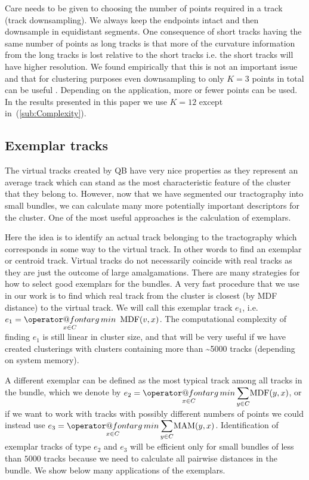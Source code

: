 \documentclass[preprint,authoryear,a4paper,10pt,onecolumn]{elsarticle}
\makeatletter
\def\argmin{\mathop{\operator@font arg\,min}}
\makeatother
\begin{document}
Care needs to be given to choosing the number of points required in a
track (track downsampling). We always keep the endpoints intact and then
downsample in equidistant segments. One consequence of short tracks
having the same number of points as long tracks is that more of the
curvature information from the long tracks is lost relative to the short
tracks i.e. the short tracks will have higher resolution.  We found
empirically that this is not an important issue and that for clustering
purposes even downsampling to only $K=3$ points in total can be useful
\citep{EGMB10}. Depending on the application, more or fewer points can
be used. In the results presented in this paper we use $K=12$ except
in~(\ref{sub:Complexity}).


\subsection{Exemplar tracks\label{sub:exemplars}}

The virtual tracks created by QB have very nice properties as they
represent an average track which can stand as the most characteristic
feature of the cluster that they belong to. However, now that we have
segmented our tractography into small bundles, we can calculate many more
potentially important descriptors for the cluster. One of the most
useful approaches is the calculation of exemplars.

Here the idea is to identify an actual track belonging to the
tractography which corresponds in some way to the virtual track. In
other words to find an exemplar or centroid track. Virtual tracks do not
necessarily coincide with real tracks as they are just the outcome of
large amalgamations. There are many strategies for how to select good
exemplars for the bundles. A very fast procedure that we use in our
work is to find which real track from the cluster is closest (by MDF
distance) to the virtual track. We will call this exemplar track $e_{1}$,
i.e.~$e_{1}={\displaystyle \argmin_{x\in C}}\textrm{\,\ MDF}(v,x)$.
The computational complexity of finding $e_{1}$ is still linear in
cluster size, and that will be very useful if we have created
clusterings with clusters containing more than \textasciitilde5000 tracks
(depending on system memory).

A different exemplar can be defined as the most typical track among all
tracks in the bundle, which we denote by $e_{2}={\displaystyle
  \argmin_{x\in C}}\,{\displaystyle \sum_{y\in C}}\mathrm{MDF}(y,x)$, or
if we want to work with tracks with possibly different numbers of points
we could instead use $e_{3}={\displaystyle \argmin_{x\in
    C}}\,{\displaystyle \sum_{y\in C}}\mathrm{MAM}(y,x)$.
Identification of exemplar tracks of type $e_{2}$ and $e_{3}$ will be
efficient only for small bundles of less than $5000$ tracks because we
need to calculate all pairwise distances in the bundle. We show below
many applications of the exemplars. 
\end{document}

